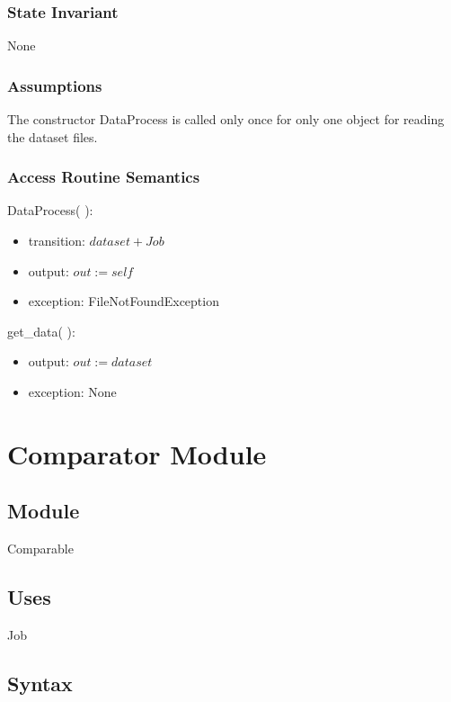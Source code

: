 \documentclass[12pt]{article}
\begin{document}
\subsubsection* {State Invariant}

None

\subsubsection* {Assumptions}

The constructor DataProcess is called only once for only one object for reading the dataset files.

\subsubsection* {Access Routine Semantics}

DataProcess( ):
\begin{itemize}
\item transition: $dataset + Job$
\item output: $out := \mathit{self}$
\item exception: FileNotFoundException
\end{itemize}

get\_data( ):
\begin{itemize}
\item output: $out := dataset$
\item exception: None
\end{itemize}


\newpage
\section* {Comparator Module}

\subsection* {Module}

Comparable

\subsection* {Uses}

Job

\subsection* {Syntax}
\end{document}
